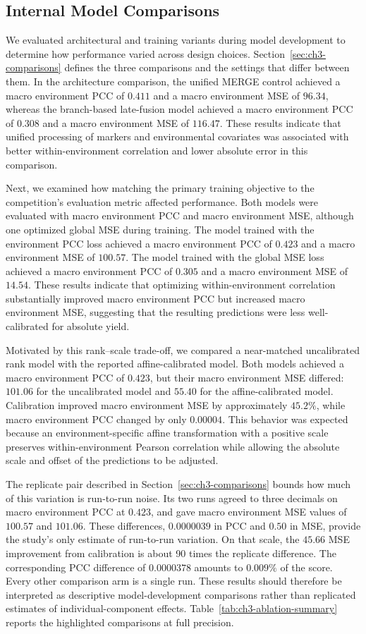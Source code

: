 \subsection{Internal Model Comparisons}
We evaluated architectural and training variants during model development to determine how performance varied across design choices. Section~\ref{sec:ch3-comparisons} defines the three comparisons and the settings that differ between them. In the architecture comparison, the unified MERGE control achieved a macro environment PCC of $0.411$ and a macro environment MSE of $96.34$, whereas the branch-based late-fusion model achieved a macro environment PCC of $0.308$ and a macro environment MSE of $116.47$. These results indicate that unified processing of markers and environmental covariates was associated with better within-environment correlation and lower absolute error in this comparison.

Next, we examined how matching the primary training objective to the competition's evaluation metric affected performance. Both models were evaluated with macro environment PCC and macro environment MSE, although one optimized global MSE during training. The model trained with the environment PCC loss achieved a macro environment PCC of $0.423$ and a macro environment MSE of $100.57$. The model trained with the global MSE loss achieved a macro environment PCC of $0.305$ and a macro environment MSE of $14.54$. These results indicate that optimizing within-environment correlation substantially improved macro environment PCC but increased macro environment MSE, suggesting that the resulting predictions were less well-calibrated for absolute yield.

Motivated by this rank--scale trade-off, we compared a near-matched uncalibrated rank model with the reported affine-calibrated model. Both models achieved a macro environment PCC of $0.423$, but their macro environment MSE differed: $101.06$ for the uncalibrated model and $55.40$ for the affine-calibrated model. Calibration improved macro environment MSE by approximately $45.2\%$, while macro environment PCC changed by only $0.00004$. This behavior was expected because an environment-specific affine transformation with a positive scale preserves within-environment Pearson correlation while allowing the absolute scale and offset of the predictions to be adjusted.

The replicate pair described in Section~\ref{sec:ch3-comparisons} bounds how much of this variation is run-to-run noise. Its two runs agreed to three decimals on macro environment PCC at $0.423$, and gave macro environment MSE values of $100.57$ and $101.06$. These differences, $0.0000039$ in PCC and $0.50$ in MSE, provide the study's only estimate of run-to-run variation. On that scale, the $45.66$ MSE improvement from calibration is about 90 times the replicate difference. The corresponding PCC difference of $0.0000378$ amounts to $0.009\%$ of the score. Every other comparison arm is a single run. These results should therefore be interpreted as descriptive model-development comparisons rather than replicated estimates of individual-component effects. Table~\ref{tab:ch3-ablation-summary} reports the highlighted comparisons at full precision.

